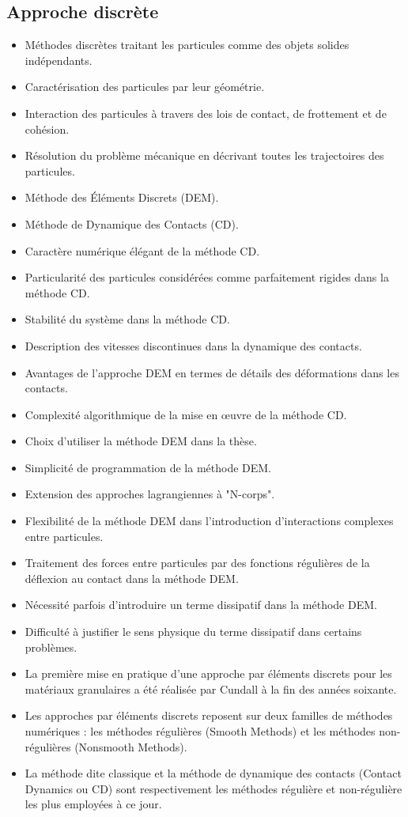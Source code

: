 \subsection{Approche discrète}
\begin{itemize}
    \item Méthodes discrètes traitant les particules comme des objets solides indépendants.
    \item Caractérisation des particules par leur géométrie.
    \item Interaction des particules à travers des lois de contact, de frottement et de cohésion.
    \item Résolution du problème mécanique en décrivant toutes les trajectoires des particules.
    \item Méthode des Éléments Discrets (DEM).
    \item Méthode de Dynamique des Contacts (CD).
    \item Caractère numérique élégant de la méthode CD.
    \item Particularité des particules considérées comme parfaitement rigides dans la méthode CD.
    \item Stabilité du système dans la méthode CD.
    \item Description des vitesses discontinues dans la dynamique des contacts.
    \item Avantages de l'approche DEM en termes de détails des déformations dans les contacts.
    \item Complexité algorithmique de la mise en œuvre de la méthode CD.
    \item Choix d'utiliser la méthode DEM dans la thèse.
    \item Simplicité de programmation de la méthode DEM.
    \item Extension des approches lagrangiennes à "N-corps".
    \item Flexibilité de la méthode DEM dans l'introduction d'interactions complexes entre particules.
    \item Traitement des forces entre particules par des fonctions régulières de la déflexion au contact dans la méthode DEM.
    \item Nécessité parfois d'introduire un terme dissipatif dans la méthode DEM.
    \item Difficulté à justifier le sens physique du terme dissipatif dans certains problèmes.
    \item La première mise en pratique d'une approche par éléments discrets pour les matériaux granulaires a été réalisée par Cundall à la fin des années soixante.
    \item Les approches par éléments discrets reposent sur deux familles de méthodes numériques : les méthodes régulières (Smooth Methods) et les méthodes non-régulières (Nonsmooth Methods).
    \item La méthode dite classique et la méthode de dynamique des contacts (Contact Dynamics ou CD) sont respectivement les méthodes régulière et non-régulière les plus employées à ce jour.
\end{itemize}

